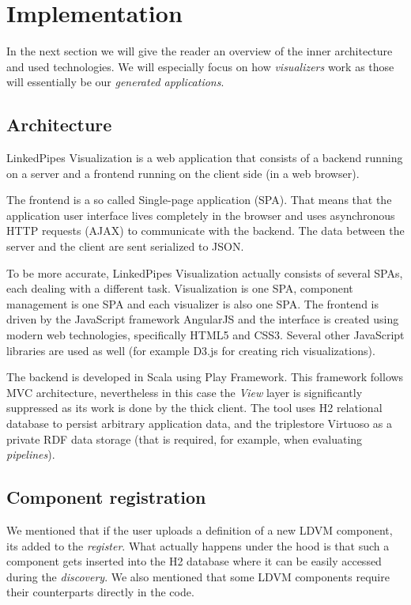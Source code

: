 \section{Implementation}

In the next section we will give the reader an overview of the inner architecture and used technologies. We will especially focus on how \emph{visualizers} work as those will essentially be our \emph{generated applications}.

\subsection{Architecture}

LinkedPipes Visualization is a web application that consists of a backend running on a server and a frontend running on the client side (in a web browser). 

The frontend is a so called Single-page application (SPA). That means that the application user interface lives completely in the browser and uses asynchronous HTTP requests (AJAX) to communicate with the backend. The data between the server and the client are sent serialized to JSON.

To be more accurate, LinkedPipes Visualization actually consists of several SPAs, each dealing with a different task. Visualization is one SPA, component management is one SPA and each visualizer is also one SPA. The frontend is driven by the JavaScript framework AngularJS and the interface is created using modern web technologies, specifically HTML5 and CSS3. Several other JavaScript libraries are used as well (for example D3.js for creating rich visualizations).

The backend is developed in Scala using Play Framework. This framework follows MVC architecture, nevertheless in this case the \emph{View} layer is significantly suppressed as its work is done by the thick client. The tool uses H2 relational database to persist arbitrary application data, and the triplestore Virtuoso as a private RDF data storage (that is required, for example, when evaluating \emph{pipelines}). 

\subsection{Component registration}
\label{sec:linkedpipes:component_registration}

We mentioned that if the user uploads a definition of a new LDVM component, its added to the \emph{register}. What actually happens under the hood is that such a component gets inserted into the H2 database where it can be easily accessed during the \emph{discovery}. We also mentioned that some LDVM components require their counterparts directly in the code.

